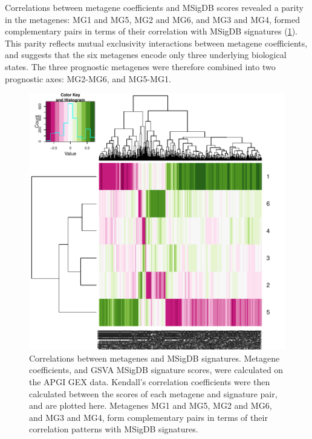 \documentclass[dissertation.tex]{subfiles}
\begin{document}
Correlations between metagene coefficients and \gls{MSigDB} scores revealed a parity in the metagenes: MG1 and MG5, MG2 and MG6, and MG3 and MG4, formed complementary pairs in terms of their correlation with \gls{MSigDB} signatures (\cref{fig:sigs-nmf-corplots}).  This parity reflects mutual exclusivity interactions between metagene coefficients, and suggests that the six metagenes encode only three underlying biological states.  The three prognostic metagenes were therefore combined into two prognostic axes: MG2-MG6, and MG5-MG1.

\begin{figure}
\centering
\includegraphics[width=.7\linewidth]{analysis/biosurv/reports/18_SIS_diag_dsd_final/figure/nmf-msigdb-cor-plots-1}
\caption{Correlations between metagenes and \acrshort{MSigDB} signatures.  Metagene coefficients, and \acrshort{GSVA} \acrshort{MSigDB} signature scores, were calculated on the \acrshort{APGI} \acrshort{GEX} data.  Kendall's correlation coefficients were then calculated between the scores of each metagene and signature pair, and are plotted here.  Metagenes MG1 and MG5, MG2 and MG6, and MG3 and MG4, form complementary pairs in terms of their correlation patterns with \acrshort{MSigDB} signatures.\label{fig:sigs-nmf-corplots}}
\end{figure}
\end{document}
